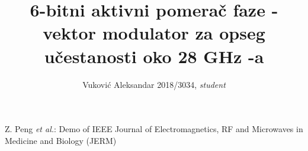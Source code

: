 \documentclass[journal,twocolumn,letterpaper]{IEEEJERM}
\begin{document}
%
\title{6-bitni aktivni pomerač faze - vektor modulator za opseg učestanosti oko 28 GHz -a}

%
\author{Vuković Aleksandar 2018/3034, \textit{student} %
}%

{Z. Peng \MakeLowercase{\textit{et al.}}: Demo of IEEE Journal of Electromagnetics, RF and Microwaves in Medicine and Biology (JERM)}






\end{document}
